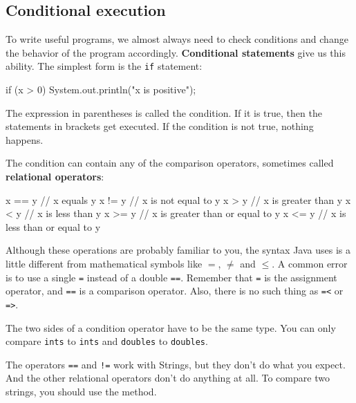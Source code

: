 \documentclass[12pt]{book}
\begin{document}
\subsection{Conditional execution}


To write useful programs, we almost always need to check conditions and change the behavior of the program accordingly.
{\bf Conditional statements} give us this ability.
The simplest form is the {\tt if} statement:

\begin{code}
    if (x > 0) {
        System.out.println("x is positive");
    }
\end{code}

The expression in parentheses is called the condition.
If it is true, then the statements in brackets get executed.
If the condition is not true, nothing happens.


The condition can contain any of the comparison operators, sometimes called {\bf relational operators}:

\begin{code}
    x == y               // x equals y
    x != y               // x is not equal to y
    x > y                // x is greater than y
    x < y                // x is less than y
    x >= y               // x is greater than or equal to y
    x <= y               // x is less than or equal to y
\end{code}

Although these operations are probably familiar to you, the syntax Java uses is a little different from mathematical symbols like $=$, $\neq$ and $\le$.
A common error is to use a single {\tt =} instead of a double {\tt ==}.
Remember that {\tt =} is the assignment operator, and {\tt ==} is a comparison operator.
Also, there is no such thing as {\tt =<} or {\tt =>}.

The two sides of a condition operator have to be the same type.
You can only compare {\tt ints} to {\tt ints} and {\tt doubles} to {\tt doubles}.

The operators {\tt ==} and {\tt !=} work with Strings, but they don't do what you expect.
And the other relational operators don't do anything at all.
To compare two strings, you should use the  method.
\end{document}
